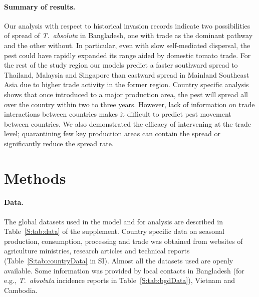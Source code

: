 \documentclass[11pt]{article}
\newcommand{\tuta}{\emph{T.~absoluta}}
\theoremstyle{definition}
\begin{document}
\paragraph{Summary of results.} 
Our analysis with respect to historical invasion records indicate two
possibilities of spread of \tuta{} in Bangladesh, one with trade as the
dominant pathway and the other without. In particular, even with slow
self-mediated dispersal, the pest could have rapidly expanded its range
aided by domestic tomato trade. For the rest of the study region our models
predict a faster southward spread to Thailand, Malaysia and Singapore than
eastward spread in Mainland Southeast Asia due to higher trade activity in
the former region. Country specific analysis shows that once introduced to
a major production area, the pest will spread all over the country within
two to three years. However, lack of information on trade interactions
between countries makes it difficult to predict pest movement between
countries. We also demonstrated the efficacy of intervening at the trade
level; quarantining few key production areas can contain the spread or
significantly reduce the spread rate.

\section{Methods}
\paragraph{Data.} The global datasets used in the model and for analysis are
described in Table~\ref{S:tab:data} of the supplement. Country specific data on
seasonal production, consumption, processing and trade was
obtained from websites of agriculture ministries, research articles and technical
reports (Table~\ref{S:tab:countryData} in SI). Almost
all the datasets used are openly available. Some information was
provided by local contacts in Bangladesh (for e.g., \tuta{} incidence
reports in Table~\ref{S:tab:bgdData}), Vietnam and Cambodia.
\end{document}
